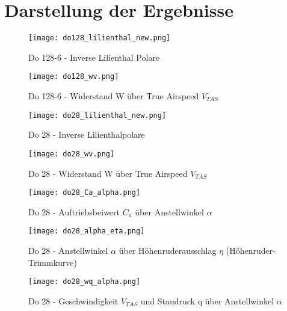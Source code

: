 \chapter{Darstellung der Ergebnisse}
\label{chapter:darstellung}
\vspace{2cm}
\begin{figure}[h]
	\begin{center}
		\texttt{[image: do128\_lilienthal\_new.png]} 
		\caption{Do 128-6 - Inverse Lilienthal Polare} \label{abb:do128_lilienthal}
	\end{center}
\end{figure}
\begin{figure}[h]
	\begin{center}
		\texttt{[image: do128\_wv.png]} 
		\caption{Do 128-6 - Widerstand W über True Airspeed $V_{TAS}$} \label{abb:do128_wv}
	\end{center}
\end{figure}
\vspace{-10mm}
\begin{figure}[h]
	\begin{center}
		\texttt{[image: do28\_lilienthal\_new.png]} 
		\caption{Do 28 - Inverse Lilienthalpolare} \label{abb:do28_lilienthal}
	\end{center}
\end{figure}
\begin{figure}[h]
\begin{center}
	\texttt{[image: do28\_wv.png]} 
	\caption{Do 28 - Widerstand W über True Airspeed $V_{TAS}$} \label{abb:do28_wv}
\end{center}
\end{figure}
\begin{figure}[h]
\begin{center}
	\texttt{[image: do28\_Ca\_alpha.png]} 
	\caption{Do 28 - Auftriebsbeiwert $C_a$ über Anstellwinkel $\alpha$} \label{abb:do28_ca_alpha}
\end{center}
\end{figure}
\begin{figure}[h]
\begin{center}
	\texttt{[image: do28\_alpha\_eta.png]} 
	\caption{Do 28 - Anstellwinkel $\alpha$ über Höhenruderausschlag $\eta$ (Höhenruder-Trimmkurve)} \label{abb:do28_alpha_eta}
\end{center}
\end{figure}
\begin{figure}[h]
\begin{center}
	\texttt{[image: do28\_wq\_alpha.png]} 
	\caption{Do 28 - Geschwindigkeit $V_{TAS}$ und Staudruck q über Anstellwinkel $\alpha$} \label{abb:do28_wq_alpha}
\end{center}
\end{figure}
\newpage